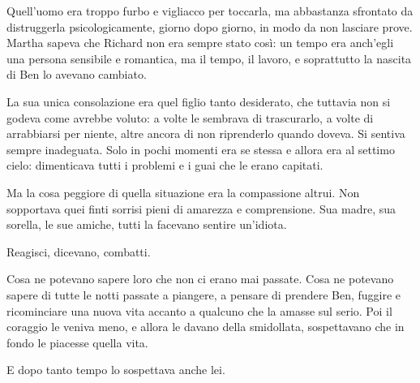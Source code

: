Quell’uomo era troppo furbo e vigliacco per toccarla, ma abbastanza sfrontato da distruggerla
psicologicamente, giorno dopo giorno, in modo da non lasciare prove. Martha sapeva che Richard non
era sempre stato così: un tempo era anch'egli una persona sensibile e romantica, ma il tempo, il
lavoro, e soprattutto la nascita di Ben lo avevano cambiato.

La sua unica consolazione era quel figlio tanto desiderato, che tuttavia non si godeva come avrebbe
voluto: a volte le sembrava di trascurarlo, a volte di arrabbiarsi per niente, altre ancora di non
riprenderlo quando doveva. Si sentiva sempre inadeguata. Solo in pochi momenti era se stessa e
allora era al settimo cielo: dimenticava tutti i problemi e i guai che le erano capitati.

Ma la cosa peggiore di quella situazione era la compassione altrui. Non sopportava quei finti
sorrisi pieni di amarezza e comprensione. Sua madre, sua sorella, le sue amiche, tutti la facevano
sentire un'idiota.

Reagisci, dicevano, combatti.

Cosa ne potevano sapere loro che non ci erano mai passate. Cosa ne potevano sapere di tutte le notti
passate a piangere, a pensare di prendere Ben, fuggire e ricominciare una nuova vita accanto a
qualcuno che la amasse sul serio. Poi il coraggio le veniva meno, e allora le davano della
smidollata, sospettavano che in fondo le piacesse quella vita.

E dopo tanto tempo lo sospettava anche lei.
